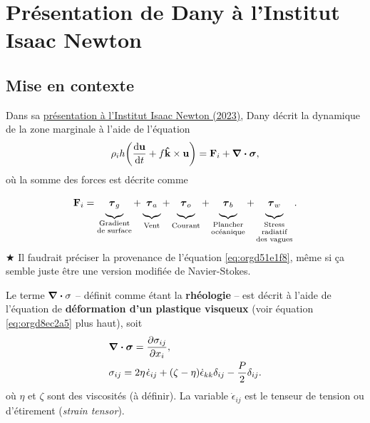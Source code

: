 \documentclass[10pt]{article}
\numberwithin{equation}{section}
\newcommand{\kvf}{\vb{\hat{k}}}
\newcommand{\uu}{\vb{u}}
\newcommand{\short}{\vphantom{pA}}
\newcommand{\tall}{\vphantom{pA^{x^x}_p}}
\newcommand{\grande}{\vphantom{\frac{1}{xx}}}
\newcommand{\pt}{\hspace{1pt}} %
\begin{document}
\section{Présentation de Dany à l'Institut Isaac Newton}
\label{sec:org6005660}

\subsection{Mise en contexte}
\label{sec:orgeae215c}

Dans sa \href{https://www.youtube.com/watch?v=\_V7ozTp6SJM}{présentation à l'Institut Isaac Newton (2023)}, Dany décrit la dynamique de la zone marginale à l'aide de l'équation
\begin{equation}
\label{eq:orgd51e1f8}
   \rho_i h \qty(\dv{\uu}{t} + f \kvf\times\uu) = \vb{F}_i + \divergence{\boldsymbol{\sigma}},
\end{equation}
où la somme des forces est décrite comme
\begin{equation}
\label{eq:orgce99ce9}
   \vb{F}_i =
    \underbrace{\grande\boldsymbol{\tau}_g}_{\substack{\text{Gradient}\short\\\text{de surface}}}
   +\underbrace{\grande\boldsymbol{\tau}_a}_{\tall\text{Vent}}
   +\underbrace{\grande\boldsymbol{\tau}_o}_{\tall\text{Courant}}
   +\underbrace{\grande\boldsymbol{\tau}_b}_{\substack{\text{Plancher}\vphantom{A^2p}\\\text{océanique}}}
   +\underbrace{\grande\boldsymbol{\tau}_w}_{\substack{\text{Stress}\short\vphantom{A^1}\\\text{radiatif}\short\\\text{des vagues}}} .
\end{equation}
\(\bigstar\) Il faudrait préciser la provenance de l'équation \ref{eq:orgd51e1f8}, même si ça semble juste être une version modifiée de Navier-Stokes.\bigskip

Le terme \(\divergence{\sigma}\) -- définit comme étant la \textbf{rhéologie} -- est décrit à l'aide de l'équation de \textbf{déformation d'un plastique visqueux} \autocite{hunke1997elastic} (voir équation \ref{eq:orgd8ec2a5} plus haut), soit
\begin{align}
   & \divergence{\boldsymbol{\sigma}} = \pdv{\sigma_{ij}}{x_i},\\
   & \sigma_{ij} = 2\eta \pt\dot{\epsilon}_{ij} + \qty(\zeta - \eta) \dot{\epsilon}_{kk} \delta_{ij} - \frac{P}{2} \delta_{ij}.
\end{align}
où \(\eta\) et \(\zeta\) sont des viscosités (à définir).
La variable \(\dot{\epsilon}_{ij}\) est le tenseur de tension ou d'étirement (\emph{strain tensor}).\bigskip
\end{document}

